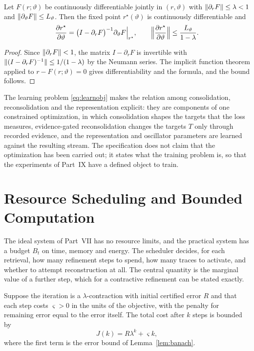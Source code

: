\begin{proposition}\label{prop:implicit}
Let $F(r;\vartheta)$ be continuously differentiable jointly in $(r,\vartheta)$ with $\lVert \partial_rF\rVert\le\lambda<1$ and $\lVert \partial_\vartheta F\rVert\le L_\vartheta$. Then the fixed point $r^\star(\vartheta)$ is continuously differentiable and
\begin{equation}
\frac{\partial r^\star}{\partial\vartheta}=\bigl(I-\partial_rF\bigr)^{-1}\partial_\vartheta F\Big|_{r^\star},\qquad\Bigl\|\frac{\partial r^\star}{\partial\vartheta}\Bigr\|\le\frac{L_\vartheta}{1-\lambda}.
\end{equation}
\end{proposition}

\begin{proof}
Since $\lVert \partial_rF\rVert<1$, the matrix $I-\partial_rF$ is invertible with $\lVert (I-\partial_rF)^{-1}\rVert\le1/(1-\lambda)$ by the Neumann series. The implicit function theorem applied to $r-F(r;\vartheta)=0$ gives differentiability and the formula, and the bound follows.
\end{proof}

The learning problem \eqref{eq:learnobj} makes the relation among consolidation, reconsolidation and the representation explicit: they are components of one constrained optimization, in which consolidation shapes the targets that the loss measures, evidence-gated reconsolidation changes the targets $T$ only through recorded evidence, and the representation and oscillator parameters are learned against the resulting stream. The specification does not claim that the optimization has been carried out; it states what the training problem is, so that the experiments of Part~IX have a defined object to train.

\chapter{Resource Scheduling and Bounded Computation}\label{ch:budget}

The ideal system of Part~VII has no resource limits, and the practical system has a budget $B_t$ on time, memory and energy. The scheduler decides, for each retrieval, how many refinement steps to spend, how many traces to activate, and whether to attempt reconstruction at all. The central quantity is the marginal value of a further step, which for a contractive refinement can be stated exactly.

Suppose the iteration is a $\lambda$-contraction with initial certified error $R$ and that each step costs $\varsigma>0$ in the units of the objective, with the penalty for remaining error equal to the error itself. The total cost after $k$ steps is bounded by
\begin{equation}\label{eq:budgetcost}
J(k)=R\lambda^k+\varsigma k,
\end{equation}
where the first term is the error bound of Lemma~\ref{lem:banach}.

